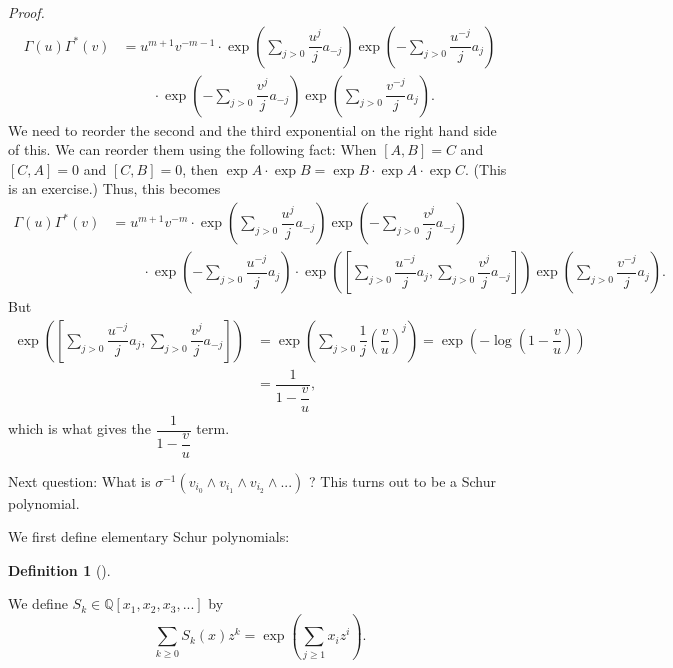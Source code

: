 \documentclass
[numbers=enddot,12pt,final,onecolumn,german,notitlepage]{scrartcl}%
\theoremstyle{definition}
\newtheorem{defi}[theo]{Definition}
\newenvironment{definition}[1][]
{\begin{defi}[#1]\begin{leftbar}}
{\end{leftbar}\end{defi}}
\begin{document}
\textit{Proof.}
\begin{align*}
\Gamma\left(  u\right)  \Gamma^{\ast}\left(  v\right)   &  =u^{m+1}%
v^{-m-1}\cdot\exp\left(  \sum\limits_{j>0}\dfrac{u^{j}}{j}a_{-j}\right)
\exp\left(  -\sum\limits_{j>0}\dfrac{u^{-j}}{j}a_{j}\right) \\
&  \ \ \ \ \ \ \ \ \ \ \cdot\exp\left(  -\sum\limits_{j>0}\dfrac{v^{j}}%
{j}a_{-j}\right)  \exp\left(  \sum\limits_{j>0}\dfrac{v^{-j}}{j}a_{j}\right)
.
\end{align*}
We need to reorder the second and the third exponential on the right hand side
of this. We can reorder them using the following fact: When $\left[
A,B\right]  =C$ and $\left[  C,A\right]  =0$ and $\left[  C,B\right]  =0$,
then $\exp A\cdot\exp B=\exp B\cdot\exp A\cdot\exp C$. (This is an exercise.)
Thus, this becomes%
\begin{align*}
\Gamma\left(  u\right)  \Gamma^{\ast}\left(  v\right)   &  =u^{m+1}v^{-m}%
\cdot\exp\left(  \sum\limits_{j>0}\dfrac{u^{j}}{j}a_{-j}\right)  \exp\left(
-\sum\limits_{j>0}\dfrac{v^{j}}{j}a_{-j}\right) \\
&  \ \ \ \ \ \ \ \ \ \ \cdot\exp\left(  -\sum\limits_{j>0}\dfrac{u^{-j}}%
{j}a_{j}\right)  \cdot\exp\left(  \left[  \sum\limits_{j>0}\dfrac{u^{-j}}%
{j}a_{j},\sum\limits_{j>0}\dfrac{v^{j}}{j}a_{-j}\right]  \right)  \exp\left(
\sum\limits_{j>0}\dfrac{v^{-j}}{j}a_{j}\right)  .
\end{align*}
But%
\begin{align*}
\exp\left(  \left[  \sum\limits_{j>0}\dfrac{u^{-j}}{j}a_{j},\sum
\limits_{j>0}\dfrac{v^{j}}{j}a_{-j}\right]  \right)   &  =\exp\left(
\sum\limits_{j>0}\dfrac{1}{j}\left(  \dfrac{v}{u}\right)  ^{j}\right)
=\exp\left(  -\log\left(  1-\dfrac{v}{u}\right)  \right) \\
&  =\dfrac{1}{1-\dfrac{v}{u}},
\end{align*}
which is what gives the $\dfrac{1}{1-\dfrac{v}{u}}$ term.

Next question: What is $\sigma^{-1}\left(  v_{i_{0}}\wedge v_{i_{1}}\wedge
v_{i_{2}}\wedge...\right)  $ ? This turns out to be a Schur polynomial.

We first define elementary Schur polynomials:

\begin{definition}
We define $S_{k}\in\mathbb{Q}\left[  x_{1},x_{2},x_{3},...\right]  $ by%
\[
\sum\limits_{k\geq0}S_{k}\left(  x\right)  z^{k}=\exp\left(  \sum
\limits_{j\geq1}x_{i}z^{i}\right)  .
\]

\end{definition}
\end{document}
